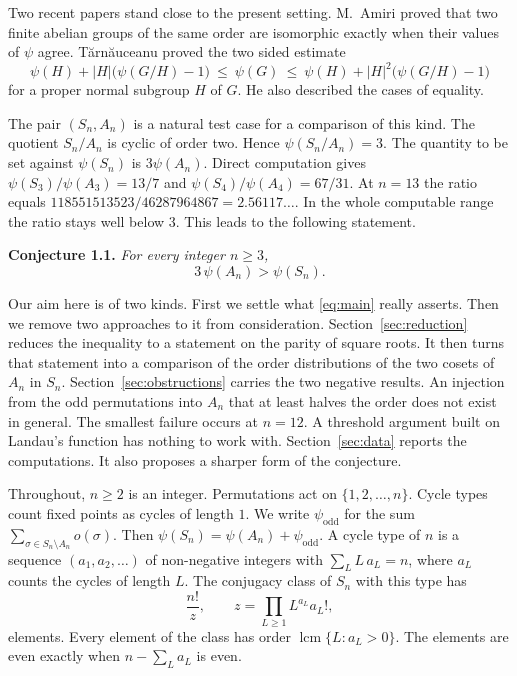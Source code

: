 \documentclass[10pt]{article}
\begin{document}
Two recent papers stand close to the present setting. M.~Amiri \cite{Amiri2025} proved that
two finite abelian groups of the same order are isomorphic exactly when their values of
$\psi$ agree. T\u{a}rn\u{a}uceanu \cite{Tarnauceanu2026} proved the two sided estimate
\begin{equation}\label{eq:tarn}
  \psi(H)+|H|\bigl(\psi(G/H)-1\bigr)\ \le\ \psi(G)\ \le\ \psi(H)+|H|^{2}\bigl(\psi(G/H)-1\bigr)
\end{equation}
for a proper normal subgroup $H$ of $G$. He also described the cases of equality.

The pair $(S_n,A_n)$ is a natural test case for a comparison of this kind. The quotient
$S_n/A_n$ is cyclic of order two. Hence $\psi(S_n/A_n)=3$. The quantity to be set against
$\psi(S_n)$ is $3\psi(A_n)$. Direct computation gives $\psi(S_3)/\psi(A_3)=13/7$ and
$\psi(S_4)/\psi(A_4)=67/31$. At $n=13$ the ratio equals
$118551513523/46287964867=2.56117\ldots$. In the whole computable range the ratio stays well
below $3$. This leads to the following statement.

\medskip\noindent
\textbf{Conjecture 1.1.} \emph{For every integer $n\ge3$,}
\begin{equation}\label{eq:main}
  3\,\psi(A_n)>\psi(S_n).
\end{equation}

\medskip
Our aim here is of two kinds. First we settle what \eqref{eq:main} really asserts. Then we
remove two approaches to it from consideration. Section~\ref{sec:reduction} reduces the
inequality to a statement on the parity of square roots. It then turns that statement into a
comparison of the order distributions of the two cosets of $A_n$ in $S_n$.
Section~\ref{sec:obstructions} carries the two negative results. An injection from the odd
permutations into $A_n$ that at least halves the order does not exist in general. The
smallest failure occurs at $n=12$. A threshold argument built on Landau's function has
nothing to work with. Section~\ref{sec:data} reports the computations. It also proposes a
sharper form of the conjecture.

Throughout, $n\ge2$ is an integer. Permutations act on $\{1,2,\dots,n\}$. Cycle types count
fixed points as cycles of length $1$. We write $\psi_{\mathrm{odd}}$ for the sum
$\sum_{\sigma\in S_n\setminus A_n}o(\sigma)$. Then
$\psi(S_n)=\psi(A_n)+\psi_{\mathrm{odd}}$. A cycle type of $n$ is a sequence
$(a_1,a_2,\dots)$ of non-negative integers with $\sum_L L\,a_L=n$, where $a_L$ counts the
cycles of length $L$. The conjugacy class of $S_n$ with this type has
\begin{equation}\label{eq:classsize}
  \frac{n!}{z},\qquad z=\prod_{L\ge1}L^{a_L}a_L!,
\end{equation}
elements. Every element of the class has order $\operatorname{lcm}\{L:a_L>0\}$. The elements
are even exactly when $n-\sum_L a_L$ is even.
\end{document}
